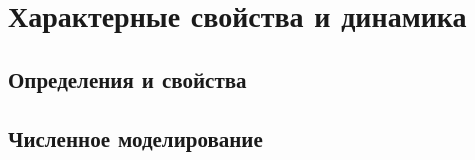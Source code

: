 \section{Характерные свойства и динамика} \label{section:neuron_dynamic}


\subsection{Определения и свойства}

%


%
%


\subsection{Численное моделирование}

